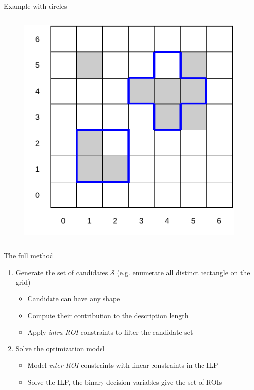 \documentclass[10pt]{beamer}
\begin{document}
\begin{frame}{Example with circles}
\begin{columns}[T, onlytextwidth]
        \begin{figure}
            \centering
            \includegraphics[scale=0.5]{figures/running-example/MDL/example-3.pdf}
        \end{figure}
    \end{columns}
\end{frame}

\begin{frame}{The full method}
    \begin{enumerate}
        \item Generate the set of candidates $\mathcal{S}$ (e.g. enumerate all distinct
            rectangle on the grid)
            \begin{itemize}
                \item Candidate can have any shape
                \item Compute their contribution to the description length
                \item Apply \emph{intra-ROI} constraints to filter the candidate set
            \end{itemize}
        \item Solve the optimization model
            \begin{itemize}
                \item Model \emph{inter-ROI} constraints with linear constraints in the ILP
                \item Solve the ILP, the binary decision variables give the set of ROIs
            \end{itemize}
    \end{enumerate}
\end{frame}
\end{document}
